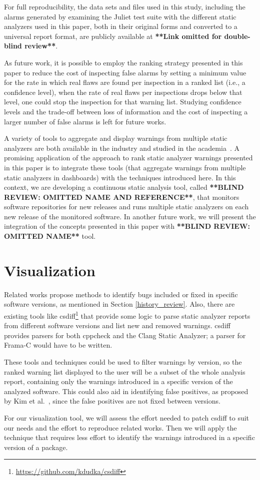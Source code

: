 For full reproducibility, the data sets and files used in this study,
including the alarms generated by examining the Juliet test suite with the
different static analyzers used in this paper, both in their original forms and
converted to a universal report format, are publicly available at
\textbf{**Link omitted for double-blind review**}.

As future work, it is possible to employ the ranking strategy presented in this
paper to reduce the cost of inspecting false alarms by setting a minimum value
for the rate in which real flaws are found per inspection in a ranked list
(i.e., a confidence level), when the rate of real flaws per inspections drops
below that level, one could stop the inspection for that warning list. Studying
confidence levels and the trade-off between loss of information and the cost of
inspecting a larger number of false alarms is left for future works.

A variety of tools to aggregate and display warnings from multiple static
analyzers are both available in the industry and studied in the
academia~\cite{buckers2017uav, heinemann2014teamscale}. A promising application
of the approach to rank static analyzer warnings presented in this paper is to
integrate these tools (that aggregate warnings from multiple static analyzers
in dashboards) with the techniques introduced here. In this context, we are
developing a continuous static analysis tool, called \textbf{**BLIND REVIEW:
OMITTED NAME AND REFERENCE**}, that monitors software repositories for new
releases and runs multiple static analyzers on each new release of the
monitored software.  In another future work, we will present the integration of
the concepts presented in this paper with \textbf{**BLIND REVIEW: OMITTED
NAME**} tool.

\section{Visualization}
\label{sec:visualization}

Related works propose methods to identify bugs included or fixed in specific
software versions, as mentioned in Section \ref{history_review}.
Also, there are existing tools like
csdiff\footnote{\url{https://github.com/kdudka/csdiff}} that provide some
logic to parse static analyzer reports from different software versions and
list new and removed warnings. csdiff provides parsers for both cppcheck and
the Clang Static Analyzer; a parser for Frama-C would have to be written.

These tools and techniques could be used to filter warnings by version, so the
ranked warning list displayed to the user will be a subset of the whole
analysis report, containing only the warnings introduced in a specific version
of the analyzed software. This could also aid in identifying false positives,
as proposed by Kim et al.~\cite{kim_which_2007}, since the false positives are
not fixed between versions.

For our visualization tool, we will assess the effort needed to patch csdiff
to suit our needs and the effort to reproduce related works. Then we will
apply the technique that requires less effort to identify the warnings introduced
in a specific version of a package.
